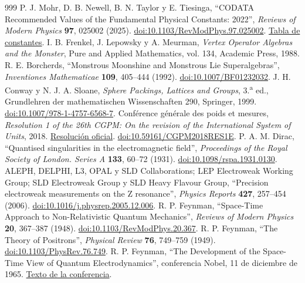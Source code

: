 \begin{thebibliography}{999}
 P. J. Mohr, D. B. Newell, B. N. Taylor y E. Tiesinga, ``CODATA Recommended Values of the Fundamental Physical Constants: 2022'', \emph{Reviews of Modern Physics} \textbf{97}, 025002 (2025). \href{https://doi.org/10.1103/RevModPhys.97.025002}{doi:10.1103/RevModPhys.97.025002}. \href{https://physics.nist.gov/cuu/Constants/Table/allascii.txt}{Tabla de constantes}.
 I. B. Frenkel, J. Lepowsky y A. Meurman, \emph{Vertex Operator Algebras and the Monster}, Pure and Applied Mathematics, vol. 134, Academic Press, 1988.
 R. E. Borcherds, ``Monstrous Moonshine and Monstrous Lie Superalgebras'', \emph{Inventiones Mathematicae} \textbf{109}, 405--444 (1992). \href{https://doi.org/10.1007/BF01232032}{doi:10.1007/BF01232032}.
 J. H. Conway y N. J. A. Sloane, \emph{Sphere Packings, Lattices and Groups}, 3.\textsuperscript{a} ed., Grundlehren der mathematischen Wissenschaften 290, Springer, 1999. \href{https://doi.org/10.1007/978-1-4757-6568-7}{doi:10.1007/978-1-4757-6568-7}.
 Conférence générale des poids et mesures, \emph{Resolution 1 of the 26th CGPM: On the revision of the International System of Units}, 2018. \href{https://www.bipm.org/en/committees/cg/cgpm/26-2018/resolution-1}{Resolución oficial}. \href{https://doi.org/10.59161/CGPM2018RES1E}{doi:10.59161/CGPM2018RES1E}.
 P. A. M. Dirac, ``Quantised singularities in the electromagnetic field'', \emph{Proceedings of the Royal Society of London. Series A} \textbf{133}, 60--72 (1931). \href{https://doi.org/10.1098/rspa.1931.0130}{doi:10.1098/rspa.1931.0130}.
 ALEPH, DELPHI, L3, OPAL y SLD Collaborations; LEP Electroweak Working Group; SLD Electroweak Group y SLD Heavy Flavour Group, ``Precision electroweak measurements on the Z resonance'', \emph{Physics Reports} \textbf{427}, 257--454 (2006). \href{https://doi.org/10.1016/j.physrep.2005.12.006}{doi:10.1016/j.physrep.2005.12.006}.
 R. P. Feynman, ``Space-Time Approach to Non-Relativistic Quantum Mechanics'', \emph{Reviews of Modern Physics} \textbf{20}, 367--387 (1948). \href{https://doi.org/10.1103/RevModPhys.20.367}{doi:10.1103/RevModPhys.20.367}.
 R. P. Feynman, ``The Theory of Positrons'', \emph{Physical Review} \textbf{76}, 749--759 (1949). \href{https://doi.org/10.1103/PhysRev.76.749}{doi:10.1103/PhysRev.76.749}.
 R. P. Feynman, ``The Development of the Space-Time View of Quantum Electrodynamics'', conferencia Nobel, 11 de diciembre de 1965. \href{https://www.nobelprize.org/prizes/physics/1965/feynman/lecture/}{Texto de la conferencia}.

\end{thebibliography}
